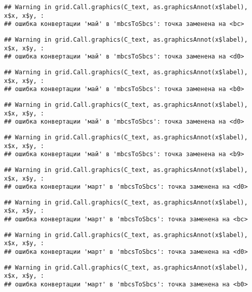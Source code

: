 \documentclass[
]{article}
\begin{document}
\begin{verbatim}
## Warning in grid.Call.graphics(C_text, as.graphicsAnnot(x$label), x$x, x$y, :
## ошибка конвертации 'май' в 'mbcsToSbcs': точка заменена на <bc>
\end{verbatim}

\begin{verbatim}
## Warning in grid.Call.graphics(C_text, as.graphicsAnnot(x$label), x$x, x$y, :
## ошибка конвертации 'май' в 'mbcsToSbcs': точка заменена на <d0>
\end{verbatim}

\begin{verbatim}
## Warning in grid.Call.graphics(C_text, as.graphicsAnnot(x$label), x$x, x$y, :
## ошибка конвертации 'май' в 'mbcsToSbcs': точка заменена на <b0>
\end{verbatim}

\begin{verbatim}
## Warning in grid.Call.graphics(C_text, as.graphicsAnnot(x$label), x$x, x$y, :
## ошибка конвертации 'май' в 'mbcsToSbcs': точка заменена на <d0>
\end{verbatim}

\begin{verbatim}
## Warning in grid.Call.graphics(C_text, as.graphicsAnnot(x$label), x$x, x$y, :
## ошибка конвертации 'май' в 'mbcsToSbcs': точка заменена на <b9>
\end{verbatim}

\begin{verbatim}
## Warning in grid.Call.graphics(C_text, as.graphicsAnnot(x$label), x$x, x$y, :
## ошибка конвертации 'март' в 'mbcsToSbcs': точка заменена на <d0>
\end{verbatim}

\begin{verbatim}
## Warning in grid.Call.graphics(C_text, as.graphicsAnnot(x$label), x$x, x$y, :
## ошибка конвертации 'март' в 'mbcsToSbcs': точка заменена на <bc>
\end{verbatim}

\begin{verbatim}
## Warning in grid.Call.graphics(C_text, as.graphicsAnnot(x$label), x$x, x$y, :
## ошибка конвертации 'март' в 'mbcsToSbcs': точка заменена на <d0>
\end{verbatim}

\begin{verbatim}
## Warning in grid.Call.graphics(C_text, as.graphicsAnnot(x$label), x$x, x$y, :
## ошибка конвертации 'март' в 'mbcsToSbcs': точка заменена на <b0>
\end{verbatim}
\end{document}
